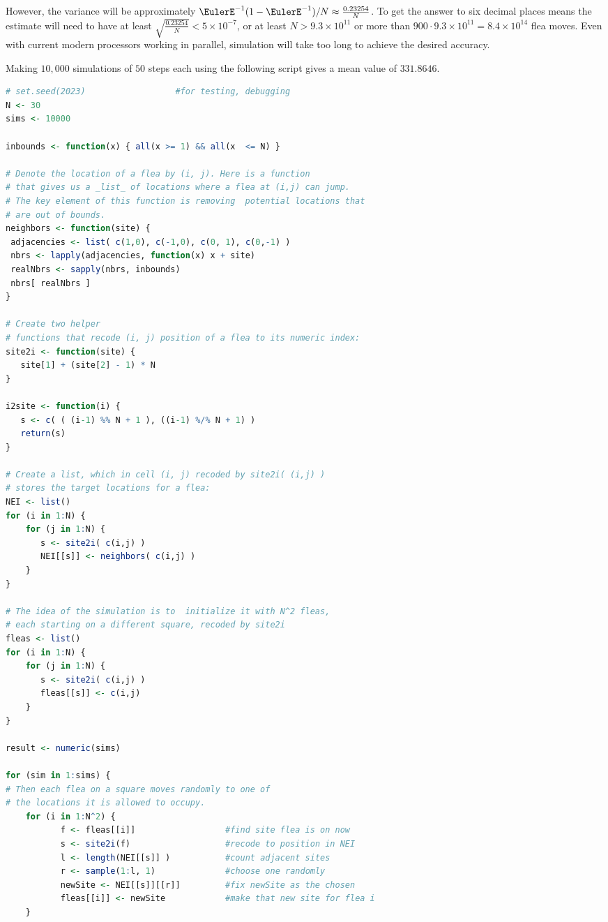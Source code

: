 \documentclass[12pt]{article}
\begin{document}
\begin{solution}
  However, the variance will be approximately \( \EulerE^{-1}  (1
  - \EulerE^{-1})/N \approx \frac{0.23254}{N} \).  To get the answer
  to six decimal places means the estimate will need to have at
  least \(\sqrt{ \frac{0.23254}{N} } < 5 \times 10^{-7} \), or at least \( N
  > 9.3 \times 10^{11} \) or more than \( 900 \cdot 9.3 \times 10^{11} 
  = 8.4 \times 10^{14} \) flea moves.  Even with current modern processors
  working in parallel,  simulation will take too long to achieve
  the desired accuracy.  

  Making \( 10{,}000 \) simulations of \( 50 \) steps each using the
  following script gives a mean value of \( 331.8646  \).
  \begin{lstlisting}[language=R]
# set.seed(2023)                  #for testing, debugging
N <- 30
sims <- 10000

inbounds <- function(x) { all(x >= 1) && all(x  <= N) }

# Denote the location of a flea by (i, j). Here is a function
# that gives us a _list_ of locations where a flea at (i,j) can jump.
# The key element of this function is removing  potential locations that
# are out of bounds.
neighbors <- function(site) {
 adjacencies <- list( c(1,0), c(-1,0), c(0, 1), c(0,-1) ) 
 nbrs <- lapply(adjacencies, function(x) x + site)
 realNbrs <- sapply(nbrs, inbounds)
 nbrs[ realNbrs ] 
}

# Create two helper
# functions that recode (i, j) position of a flea to its numeric index:
site2i <- function(site) {
   site[1] + (site[2] - 1) * N
}

i2site <- function(i) {
   s <- c( ( (i-1) %% N + 1 ), ((i-1) %/% N + 1) )
   return(s)
}

# Create a list, which in cell (i, j) recoded by site2i( (i,j) )
# stores the target locations for a flea:
NEI <- list()
for (i in 1:N) {
    for (j in 1:N) {
       s <- site2i( c(i,j) )
       NEI[[s]] <- neighbors( c(i,j) )
    }
}

# The idea of the simulation is to  initialize it with N^2 fleas,
# each starting on a different square, recoded by site2i
fleas <- list()
for (i in 1:N) {
    for (j in 1:N) {
       s <- site2i( c(i,j) )
       fleas[[s]] <- c(i,j)
    }
}

result <- numeric(sims)

for (sim in 1:sims) {
# Then each flea on a square moves randomly to one of
# the locations it is allowed to occupy.
    for (i in 1:N^2) {
           f <- fleas[[i]]                  #find site flea is on now
           s <- site2i(f)                   #recode to position in NEI
           l <- length(NEI[[s]] )           #count adjacent sites
           r <- sample(1:l, 1)              #choose one randomly
           newSite <- NEI[[s]][[r]]         #fix newSite as the chosen  
           fleas[[i]] <- newSite            #make that new site for flea i
    }


\end{lstlisting}
\end{solution}
\end{document}
